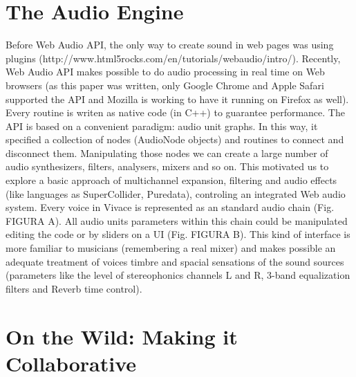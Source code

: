 \documentclass[letterpaper, 12pt]{article}
\begin{document}
\section{The Audio Engine}
\label{audioengine}
Before Web Audio API, the only way to create sound in web pages was using plugins (http://www.html5rocks.com/en/tutorials/webaudio/intro/). Recently, Web Audio API makes possible to do audio processing in real time on Web browsers (as this paper was written, only Google Chrome and Apple Safari supported the API and Mozilla is working to have it running on Firefox as well). Every routine is writen as native code (in C++) to guarantee performance. The API is based on a convenient paradigm: audio unit graphs. In this way, it specified a collection of nodes (AudioNode objects) and routines to connect and disconnect them. Manipulating those nodes we can create a large number of audio synthesizers, filters, analysers, mixers and so on. This motivated us to explore a basic approach of multichannel expansion, filtering and audio effects (like languages as SuperCollider, Puredata), controling an integrated Web audio system. 
Every voice in Vivace is represented as an standard audio chain (Fig. FIGURA A). All audio units parameters within this chain could be manipulated editing the code or by sliders on a UI (Fig. FIGURA B). This kind of interface is more familiar to musicians (remembering a real mixer) and makes possible an adequate treatment of voices timbre and spacial sensations of the sound sources (parameters like the level of stereophonics channels L and R, 3-band equalization filters and Reverb time control).

\section{On the Wild: Making it Collaborative}
\label{freakcoding}
\end{document}
